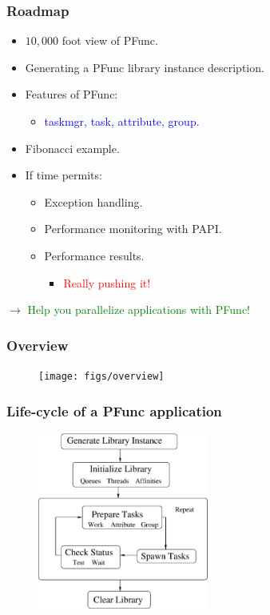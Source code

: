 \documentclass{beamer}
\begin{document}
\begin{frame}[fragile]
\frametitle{Roadmap}
\begin{itemize}
\item $10,000$ foot view of PFunc.
\item Generating a PFunc library instance description.
\item Features of PFunc: 
  \begin{itemize}
  \item \textcolor{blue}{taskmgr, task, attribute, group.}
  \end{itemize}
\item Fibonacci example.
\item If time permits:
  \begin{itemize}
  \item Exception handling.
  \item Performance monitoring with PAPI.
  \item Performance results.
    \begin{itemize}
    \item \textcolor{red}{Really pushing it!}
    \end{itemize}
  \end{itemize}
\end{itemize}
\begin{center}
$\rightarrow{}$ \textcolor{green}{Help you parallelize applications with PFunc!}
\end{center}
\end{frame}

\begin{frame}
\frametitle{Overview}
\begin{figure}[t]
\centering
\texttt{[image: figs/overview]}
\label{fig:overview}
\end{figure}
\end{frame}

\begin{frame}
\frametitle{Life-cycle of a PFunc application}
\begin{figure}[t]
\centering
\includegraphics[width=0.5\textwidth]{figs/life-cycle}
\label{fig:life_cycle}
\end{figure}
\end{frame}
\end{document}
